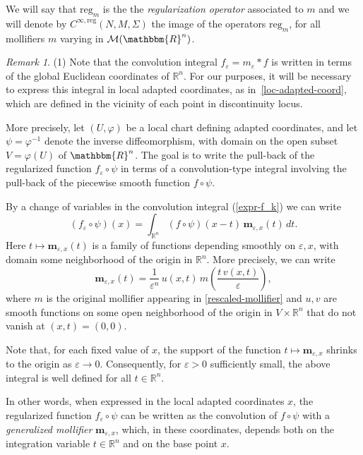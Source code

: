 \documentclass[11pt,psamsfonts]{article}
\newcommand{\tmmathbf}[1]{\ensuremath{\boldsymbol{#1}}}
\theoremstyle{definition}
\theoremstyle{remark}
\newtheorem{Remark}[Theorem]{Remark}
\newcommand{\cR}{\ensuremath{\mathbbm{R}}}
\newcommand{\eps}{\varepsilon }
\newcommand{\Mol}{\mathcal{M}}
\newcommand{\reg}{\mathrm{reg}}
\begin{document}
We will say that $\reg_m$ is the the {\em regularization operator} associated to $m$ and we will denote by $C^{\infty,\reg}(N,M,\Sigma)$ the image of the operators $\reg_m$,  for all mollifiers $m$ varying in $\Mol(\cR^n)$.  
\begin{Remark}\label{remark-dependence-base-point}
(1) Note that the convolution integral  \( f_\varepsilon = m_\varepsilon \ast f \)
is written in terms of the global Euclidean coordinates of \( \mathbb{R}^n \).
For our purposes, it will be necessary to express this integral in local adapted
coordinates, as in~\eqref{loc-adapted-coord}, which are defined in the vicinity of each point 
in discontinuity locus.

More precisely, let \((U,\varphi)\) be a local chart defining adapted coordinates, and let
\(\psi = \varphi^{-1}\) denote the inverse diffeomorphism, with domain on the open subset $V=\varphi(U)$ of $\cR^n$.  
The goal is to write the pull-back of the regularized function $f_\eps \circ \psi$ in terms of a convolution-type integral involving the pull-back of the piecewise smooth function $f\circ \psi$.  

By a change of variables in the convolution integral (\ref{expr-f_k}) we can write 
\begin{equation}\label{convolution-local-charts}
(f_\varepsilon \circ \psi)(x)
= \int_{\mathbb{R}^n} (f \circ \psi)(x - t)\,
\tmmathbf{m}_{\varepsilon,x}(t)\, dt .
\end{equation}
Here \(t \mapsto \tmmathbf{m}_{\varepsilon,x}(t)\) is a family of functions depending smoothly on $\eps,x$, with domain some neighborhood of the origin in
\(\mathbb{R}^n\).  More precisely, we can write
\[
\tmmathbf{m}_{\varepsilon,x}(t)
= \frac{1}{\varepsilon^n}\, u(x,t)\,
m\!\left(\frac{t\, v(x,t)}{\varepsilon}\right),
\]
where \(m\) is the original mollifier appearing in \eqref{rescaled-mollifier} and \(u,v\) are smooth functions on
some open neighborhood of the origin in \(V \times \mathbb{R}^n\) that do not vanish at \((x,t) = (0,0)\).  

Note that, for each fixed value of \(x\), the support of the function
\(t \mapsto \mathbf{m}_{\varepsilon,x}\) shrinks to the origin as
\(\varepsilon \to 0\). Consequently, for \(\varepsilon > 0\) sufficiently
small, the above integral is well defined for all \(t \in \mathbb{R}^n\).

In other words, when expressed in the local adapted coordinates \(x\), the
regularized function \(f_\varepsilon \circ \psi\) can be written as the
convolution of \(f \circ \psi\) with a \emph{generalized mollifier}
\(\tmmathbf{m}_{\varepsilon,x}\), which, in these coordinates, depends both on
the integration variable \(t \in \mathbb{R}^n\) and on the base point \(x\).


\end{Remark}
\end{document}
